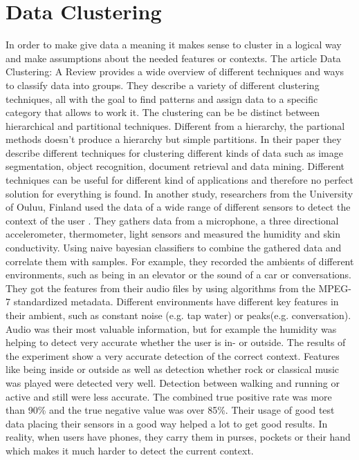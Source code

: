 \section{Data Clustering}
In order to make give data a meaning it makes sense to cluster in a logical way and make assumptions about the needed features or contexts. 
The article Data Clustering: A Review \cite{jain1999data} provides a wide overview of different techniques and ways to classify data into groups. They describe a variety of different clustering techniques, all with the goal to find patterns and assign data to a specific category that allows to work it. The clustering can be be distinct between hierarchical and partitional techniques. Different from a hierarchy, the partional methods doesn't produce a hierarchy but simple partitions. In their paper they describe different techniques for clustering different kinds of data such as image segmentation, object recognition, document retrieval and data mining. Different techniques can be useful for different kind of applications and therefore no perfect solution for everything is found. 
In another study, researchers from the University of Ouluu, Finland used the data of a wide range of different sensors to detect the context of the user \cite{korpipaa2003bayesian}. They gathers data from a microphone, a three directional accelerometer, thermometer, light sensors and measured the humidity and skin conductivity. 
Using naive bayesian classifiers to combine the gathered data and correlate them with samples. For example, they recorded the ambients of different environments, such as being in an elevator or the sound of a car or conversations. They got the features from their audio files by using algorithms from the MPEG-7 standardized metadata. Different environments have different key features in their ambient, such as constant noise (e.g. tap water) or peaks(e.g. conversation).
Audio was their most valuable information, but for example the humidity was helping to detect very accurate whether the user is in- or outside.
The results of the experiment show a very accurate detection of the correct context. Features like being inside or outside as well as detection whether rock or classical music was played were detected very well. Detection between walking and running or active and still were less accurate.
The combined true positive rate was more than 90\% and the true negative value was over 85\%. Their usage of good test data placing their sensors in a good way helped a lot to get good results. In reality, when users have phones, they carry them in purses, pockets or their hand which makes it much harder to detect the current context.
